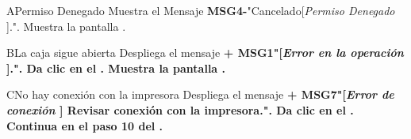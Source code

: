 	\begin{UCtrayectoriaA}{A}{Permiso Denegado}
			\UCpaso Muestra el Mensaje {\bf MSG4-}"Cancelado[{\em Permiso Denegado }].".
			\UCpaso Muestra la pantalla .
		\end{UCtrayectoriaA}
		\begin{UCtrayectoriaA}{B}{La caja sigue abierta}
			\UCpaso Despliega el mensaje \bf {+ MSG1}"[{\em Error en la operación }].".
			\UCpaso[\UCactor] Da clic en el .
			\UCpaso Muestra la pantalla .
		\end{UCtrayectoriaA}

	\begin{UCtrayectoriaA}{C}{No hay conexión con la impresora}
			\UCpaso Despliega el mensaje \bf {+ MSG7}"[{\em Error de conexión }] Revisar conexión con la impresora.".
			\UCpaso[\UCactor] Da clic en el .
			\UCpaso Continua en el paso 10 del .
		\end{UCtrayectoriaA}